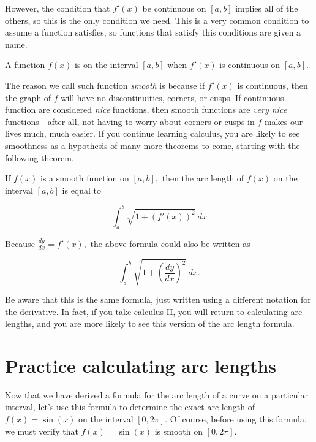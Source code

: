 \documentclass[handout,nooutcomes]{ximera}
\begin{document}
However, the condition that $f'(x)$ be continuous on $[a,b]$ implies all of the others, so this is the only condition we need.  This is a very common condition to assume a function satisfies, so functions that satisfy this conditions are given a name.

\begin{definition}
A function $f(x)$ is  on the interval $[a,b]$ when $f'(x)$ is continuous on $[a,b].$
\end{definition}

The reason we call such function \textit{smooth} is because if $f'(x)$ is continuous, then the graph of $f$ will have no discontinuities, corners, or cusps.  If continuous function are considered \textit{nice} functions, then smooth functions are \textit{very nice} functions - after all, not having to worry about corners or cusps in $f$ makes our lives much, much easier.  If you continue learning calculus, you are likely to see smoothness as a hypothesis of many more theorems to come, starting with the following theorem.

\begin{theorem}
If $f(x)$ is a smooth function on $[a,b],$ then the arc length of $f(x)$ on the interval $[a,b]$ is equal to

$$\displaystyle\int_{a}^{b} \sqrt{1+(f'(x))^2} \ dx$$

\end{theorem}

\begin{warning}
Because $\frac{dy}{dx} = f'(x),$ the above formula could also be written as

$$\displaystyle\int_{a}^{b} \sqrt{1+\left(\frac{dy}{dx}\right)^2} \ dx.$$

Be aware that this is the same formula, just written using a different notation for the derivative.  In fact, if you take calculus II, you will return to calculating arc lengths, and you are more likely to see this version of the arc length formula.
\end{warning}

\section{Practice calculating arc lengths}


Now that we have derived a formula for the arc length of a curve on a particular interval, let's use this formula to determine the exact arc length of $f(x)=\sin(x)$ on the interval $[0,2\pi]$.  Of course, before using this formula, we must verify that $f(x)=\sin(x)$ is smooth on $[0,2\pi]$.
\end{document}
